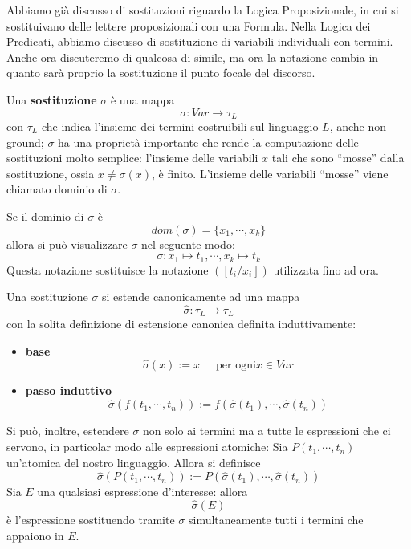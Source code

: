 Abbiamo già discusso di sostituzioni riguardo la Logica Proposizionale, in cui 
si sostituivano delle lettere proposizionali con una Formula. Nella Logica dei Predicati, 
abbiamo discusso di sostituzione di variabili individuali con termini. Anche 
ora discuteremo di qualcosa di simile, ma ora la notazione cambia in quanto 
sarà proprio la sostituzione il punto focale del discorso. 

\begin{defi}[Sostituzione]
        Una \textbf{sostituzione} $\sigma$ è una mappa 
        $$
        \sigma: Var \rightarrow \tau_{L}
        $$
        con $\tau_{L}$ che indica l'insieme dei termini costruibili sul linguaggio 
        $L$, anche non ground; $\sigma$ ha una proprietà importante che rende 
        la computazione delle sostituzioni molto semplice: l'insieme delle variabili 
        $x$ tali che sono ``mosse'' dalla sostituzione, ossia $x \neq \sigma(x)$, 
        è finito. 
        L'insieme  delle variabili ``mosse'' viene chiamato dominio di $\sigma$. 
\end{defi}

Se il dominio di $\sigma$ è 
$$
dom(\sigma) = \{x_1, \cdots, x_k\}
$$
allora si può visualizzare $\sigma$ nel seguente modo: 
$$
\sigma: x_1 \mapsto t_1, \cdots, x_k \mapsto t_k
$$
Questa notazione sostituisce la notazione $([t_i/x_i])$ utilizzata fino ad ora. 

\begin{defi}
Una sostituzione $\sigma$ si estende canonicamente ad una mappa 
$$
\hat{\sigma}: \tau_L \mapsto \tau_L
$$
con la solita definizione di estensione canonica definita induttivamente: 
\begin{itemize}
        \item{\textbf{base}}
                $$
                \hat{\sigma}(x)  := x ~~~~~ \text{ per ogni} x \in Var 
                $$
        \item{\textbf{passo induttivo}}
                $$
                \hat{\sigma}(f(t_1, \cdots, t_n)) := f(\hat{\sigma}(t_1), \cdots, \hat{\sigma}(t_n))
                $$
\end{itemize}

Si può, inoltre, estendere $\sigma$ non solo ai termini ma a tutte le espressioni 
che ci servono, in particolar modo alle espressioni atomiche: 
Sia $P(t_1, \cdots, t_n)$ un'atomica del nostro linguaggio. Allora si definisce 
$$
\hat{\sigma}(P(t_1, \cdots, t_n)) := P(\hat{\sigma}(t_1), \cdots, \hat{\sigma}(t_n))
$$
Sia $E$ una qualsiasi espressione d'interesse: allora 
$$
\hat{\sigma}(E)
$$
è l'espressione sostituendo tramite $\sigma$ simultaneamente tutti i termini 
che appaiono in $E$. 
\end{defi}

